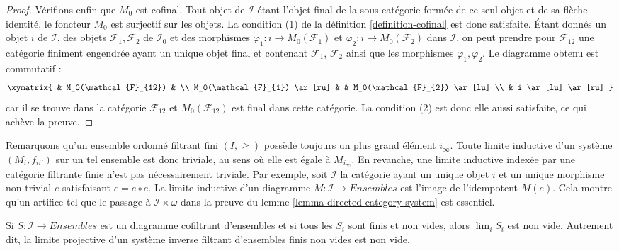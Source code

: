 \begin{proof}
\medskip\noindent
Vérifions enfin que $M_0$ est cofinal. Tout objet de $\mathcal{I}$ étant
l'objet final de la sous-catégorie formée de ce seul objet et de sa flèche
identité, le foncteur $M_0$ est surjectif sur les objets. La condition (1) de
la définition \ref{definition-cofinal} est donc satisfaite. Étant donnés un
objet $i$ de $\mathcal{I}$, des objets $\mathcal{F}_1, \mathcal{F}_2$ de
$\mathcal{I}_0$ et des morphismes
$\varphi_1 : i \to M_0(\mathcal{F}_1)$ et
$\varphi_2 : i \to M_0(\mathcal{F}_2)$ dans $\mathcal{I}$, on peut prendre
pour $\mathcal{F}_{12}$ une catégorie finiment engendrée ayant un unique
objet final et contenant $\mathcal{F}_1$, $\mathcal{F}_2$ ainsi que les
morphismes $\varphi_1, \varphi_2$. Le diagramme obtenu est commutatif :
$$
\xymatrix{
& M_0(\mathcal{F}_{12}) & \\
M_0(\mathcal{F}_{1}) \ar[ru] & & M_0(\mathcal{F}_{2}) \ar[lu] \\
& i \ar[lu] \ar[ru]
}
$$
car il se trouve dans la catégorie $\mathcal{F}_{12}$ et
$M_0(\mathcal{F}_{12})$ est final dans cette catégorie. La condition (2) est
donc elle aussi satisfaite, ce qui achève la preuve.
\end{proof}

\begin{remark}
\label{remark-trick-needed}
Remarquons qu'un ensemble ordonné filtrant fini $(I, \geq)$ possède toujours
un plus grand élément $i_\infty$. Toute limite inductive d'un système
$(M_i, f_{ii'})$ sur un tel ensemble est donc triviale, au sens où elle est
égale à $M_{i_\infty}$. En revanche, une limite inductive indexée par une
catégorie filtrante finie n'est pas nécessairement triviale. Par exemple,
soit $\mathcal{I}$ la catégorie ayant un unique objet $i$ et un unique
morphisme non trivial $e$ satisfaisant $e = e \circ e$. La limite inductive
d'un diagramme $M : \mathcal{I} \to Ensembles$ est l'image de l'idempotent $M(e)$.
Cela montre qu'un artifice tel que le passage à
$\mathcal{I}\times \omega$ dans la preuve du
lemme \ref{lemma-directed-category-system} est essentiel.
\end{remark}

\begin{lemma}
\label{lemma-nonempty-limit}
Si $S : \mathcal{I} \to \textit{Ensembles}$ est un diagramme cofiltrant
d'ensembles et si tous les $S_i$ sont finis et non vides, alors
$\lim_i S_i$ est non vide. Autrement dit, la limite projective d'un système
inverse filtrant d'ensembles finis non vides est non vide.
\end{lemma}

